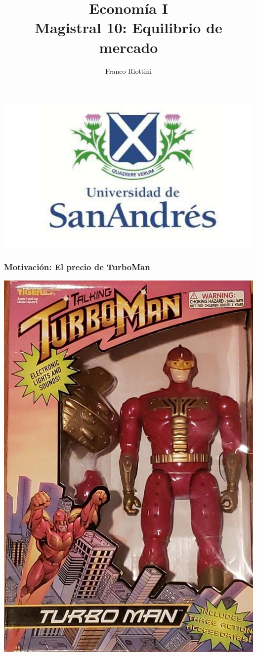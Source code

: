 \documentclass{beamer}
\title[Economía I]{Economía I \vspace{4mm}
\\ Magistral 10: Equilibrio de mercado}
\date{}
\author[Riottini]{Franco Riottini}
\institute[]{Universidad de San Andrés}
\begin{document}
\begin{frame}
\titlepage
\centering
\includegraphics[scale=0.2]{../Figures/logoUDESA.jpg} 
\end{frame} 

\begin{frame}
\frametitle{Motivación: El precio de TurboMan}
\centering
\href{https://www.youtube.com/watch?v=LCK5jetqpeM}{\includegraphics[scale=0.1]{../Figures/Tema_04.01_Turboman.jpg}}
\end{frame}
\end{document}
